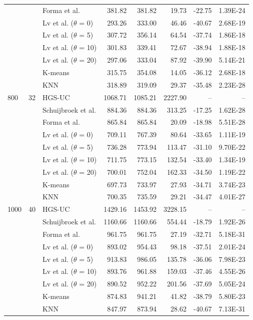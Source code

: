 \documentclass[11pt]{article}
\numberwithin{table}{section}
\numberwithin{figure}{section}
\begin{document}
\begin{landscape}
\begin{longtable}{llp{4.3cm}rrrrr}
 &  & Forma et al. & 381.82 & 381.82 & 19.73 & -22.75 & 1.39E-24 \\
 &  & Lv et al. ($\theta$ = 0) & 293.26 & 333.00 & 46.46 & -40.67 & 2.68E-19 \\
 &  & Lv et al. ($\theta$ = 5) & 307.72 & 356.14 & 64.54 & -37.74 & 1.86E-18 \\
 &  & Lv et al. ($\theta$ = 10) & 301.83 & 339.41 & 72.67 & -38.94 & 1.88E-18 \\
 &  & Lv et al. ($\theta$ = 20) & 297.06 & 333.04 & 87.92 & -39.90 & 5.14E-21 \\
 &  & K-means & 315.75 & 354.08 & 14.05 & -36.12 & 2.68E-18 \\
 &  & KNN & 318.89 & 319.09 & 29.37 & -35.48 & 2.23E-28 \\
\midrule
800 & 32 & HGS-UC & 1068.71 & 1085.21 & 2227.90 & -- & -- \\
 &  & Schuijbroek et al. & 884.36 & 884.36 & 313.25 & -17.25 & 1.62E-28 \\
 &  & Forma et al. & 865.84 & 865.84 & 20.09 & -18.98 & 5.51E-28 \\
 &  & Lv et al. ($\theta$ = 0) & 709.11 & 767.39 & 80.64 & -33.65 & 1.11E-19 \\
 &  & Lv et al. ($\theta$ = 5) & 736.28 & 773.94 & 113.47 & -31.10 & 9.70E-22 \\
 &  & Lv et al. ($\theta$ = 10) & 711.75 & 773.15 & 132.54 & -33.40 & 1.34E-19 \\
 &  & Lv et al. ($\theta$ = 20) & 700.01 & 752.04 & 162.33 & -34.50 & 1.19E-22 \\
 &  & K-means & 697.73 & 733.97 & 27.93 & -34.71 & 3.74E-23 \\
 &  & KNN & 700.35 & 735.59 & 29.21 & -34.47 & 4.01E-27 \\
\midrule
1000 & 40 & HGS-UC & 1429.16 & 1453.92 & 3228.15 & -- & -- \\
 &  & Schuijbroek et al. & 1160.66 & 1160.66 & 554.44 & -18.79 & 1.92E-26 \\
 &  & Forma et al. & 961.75 & 961.75 & 27.19 & -32.71 & 5.18E-31 \\
 &  & Lv et al. ($\theta$ = 0) & 893.02 & 954.43 & 98.18 & -37.51 & 2.01E-24 \\
 &  & Lv et al. ($\theta$ = 5) & 913.83 & 986.05 & 135.78 & -36.06 & 7.98E-23 \\
 &  & Lv et al. ($\theta$ = 10) & 893.76 & 961.88 & 159.03 & -37.46 & 4.55E-26 \\
 &  & Lv et al. ($\theta$ = 20) & 890.52 & 952.22 & 201.56 & -37.69 & 5.05E-24 \\
 &  & K-means & 874.83 & 941.21 & 41.82 & -38.79 & 5.80E-23 \\
 &  & KNN & 847.97 & 873.94 & 28.62 & -40.67 & 7.13E-31 \\
\end{longtable}
\end{landscape}
\end{document}
